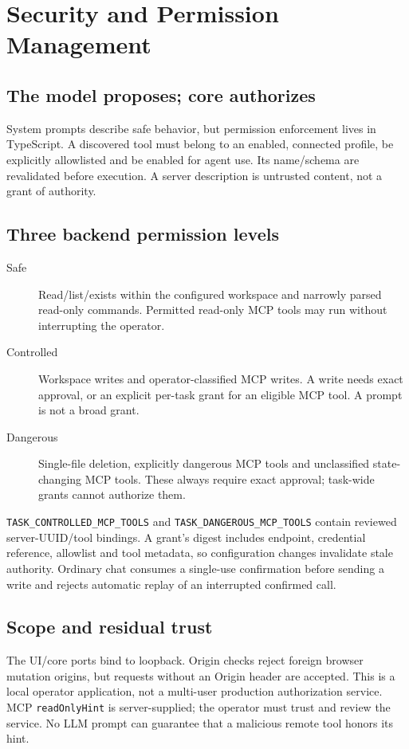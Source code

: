 \chapter{Security and Permission Management}
\section{The model proposes; core authorizes}
System prompts describe safe behavior, but permission enforcement lives in TypeScript. A discovered tool must belong to an enabled, connected profile, be explicitly allowlisted and be enabled for agent use. Its name/schema are revalidated before execution. A server description is untrusted content, not a grant of authority.
\begin{center}\end{center}
\section{Three backend permission levels}
\begin{description}
\item[Safe] Read/list/exists within the configured workspace and narrowly parsed read-only commands. Permitted read-only MCP tools may run without interrupting the operator.
\item[Controlled] Workspace writes and operator-classified MCP writes. A write needs exact approval, or an explicit per-task grant for an eligible MCP tool. A prompt is not a broad grant.
\item[Dangerous] Single-file deletion, explicitly dangerous MCP tools and unclassified state-changing MCP tools. These always require exact approval; task-wide grants cannot authorize them.
\end{description}
\texttt{TASK\_CONTROLLED\_MCP\_TOOLS} and \texttt{TASK\_DANGEROUS\_MCP\_TOOLS} contain reviewed server-UUID/tool bindings. A grant's digest includes endpoint, credential reference, allowlist and tool metadata, so configuration changes invalidate stale authority. Ordinary chat consumes a single-use confirmation before sending a write and rejects automatic replay of an interrupted confirmed call.
\section{Scope and residual trust}
The UI/core ports bind to loopback. Origin checks reject foreign browser mutation origins, but requests without an Origin header are accepted. This is a local operator application, not a multi-user production authorization service. MCP \texttt{readOnlyHint} is server-supplied; the operator must trust and review the service. No LLM prompt can guarantee that a malicious remote tool honors its hint.
